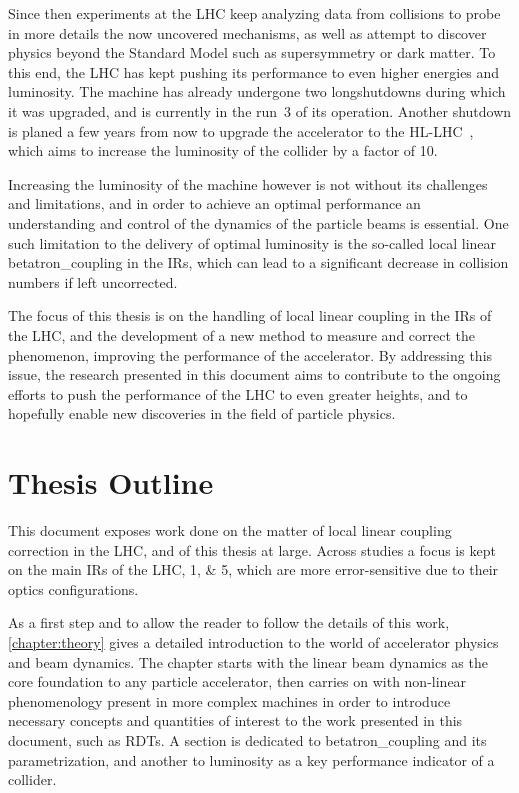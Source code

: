 Since then experiments at the \gls{LHC} keep analyzing data from collisions to probe in more details the now uncovered mechanisms, as well as attempt to discover physics beyond the Standard Model such as supersymmetry or dark matter.
To this end, the LHC has kept pushing its performance to even higher energies and \gls{luminosity}.
The machine has already undergone two \glspl{longshutdown} during which it was upgraded, and is currently in the \Gls{run}~\num{3} of its operation.
Another shutdown is planed a few years from now to upgrade the accelerator to the \gls{HL-LHC}~\cite{Website:HLLHC}, which aims to increase the \gls{luminosity} of the collider by a factor of \num{10}.

Increasing the luminosity of the machine however is not without its challenges and limitations, and in order to achieve an optimal performance an understanding and control of the dynamics of the particle beams is essential.
One such limitation to the delivery of optimal \gls{luminosity} is the so-called local linear \gls{betatron_coupling} in the \glspl{IR}, which can lead to a significant decrease in collision numbers if left uncorrected.

The focus of this thesis is on the handling of local linear coupling in the \glspl{IR} of the \gls{LHC}, and the development of a new method to measure and correct the phenomenon, improving the performance of the accelerator.
By addressing this issue, the research presented in this document aims to contribute to the ongoing efforts to push the performance of the \gls{LHC} to even greater heights, and to hopefully enable new discoveries in the field of particle physics.

\section{Thesis Outline}

This document exposes work done on the matter of local linear coupling correction in the LHC, and of this thesis at large.
Across studies a focus is kept on the main \glspl{IR} of the \gls{LHC}, \numlist{1;5}, which are more error-sensitive due to their optics configurations.

As a first step and to allow the reader to follow the details of this work, \cref{chapter:theory} gives a detailed introduction to the world of accelerator physics and beam dynamics.
The chapter starts with the linear beam dynamics as the core foundation to any particle accelerator, then carries on with non-linear phenomenology present in more complex machines in order to introduce necessary concepts and quantities of interest to the work presented in this document, such as \glspl{RDT}.
A section is dedicated to \gls{betatron_coupling} and its parametrization, and another to \gls{luminosity} as a key performance indicator of a collider.

